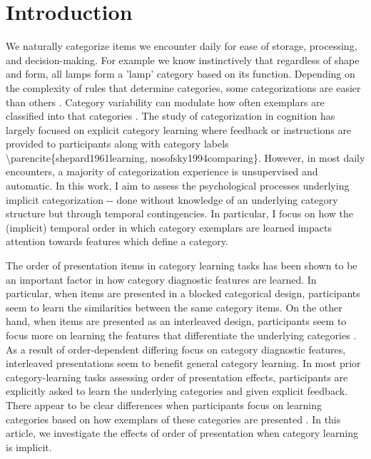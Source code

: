 \section{Introduction}

We naturally categorize items we encounter daily for ease of storage, processing, and decision-making. For example we know instinctively that regardless of shape and form, all lamps form a 'lamp' category based on its function. Depending on the complexity of rules that determine categories, some categorizations are easier than others \parencite{shepard1961learning, nosofsky1994comparing}. Category variability can modulate how often exemplars are classified into that categories \parencite{cohen2001category}. \ac{The study of categorization in cognition has largely focused on explicit category learning where feedback or instructions are provided to participants along with category labels \parencite{shepard1961learning, nosofsky1994comparing}. However, in most daily encounters, a majority of categorization experience is unsupervised and automatic. In this work, I aim to assess the psychological processes underlying implicit categorization -- done without knowledge of an underlying category structure but through temporal contingencies. In particular, I focus on how the (implicit) temporal order in which category exemplars are learned impacts attention towards features which define a category.}

The order of presentation items in category learning tasks has been shown to be an important factor in how category diagnostic features are learned. In particular, when items are presented in a blocked categorical design, participants seem to learn the similarities between the same category items. On the other hand, when items are presented as an interleaved design, participants seem to focus more on learning the features that differentiate the underlying categories \parencite{carvalho2017sequence}. As a result of order-dependent differing focus on category diagnostic features, interleaved presentations seem to benefit general category learning. In most prior category-learning tasks assessing order of presentation effects, participants are explicitly asked to learn the underlying categories and given explicit feedback. There appear to be clear differences when participants focus on learning categories based on how exemplars of these categories are presented \parencite{kornell2008learning, kornell2010spacing, whitehead2021transfer, vlach2008spacing, carvalho2014putting, carvalho2017sequence}. In this article, we investigate the effects of order of presentation when category learning is implicit. 

